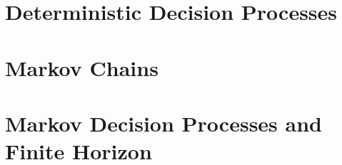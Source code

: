 \documentclass[12pt]{book}
\begin{document}
% 



% 


% 


% 

\setcounter{chapter}{1}
\chapter{Deterministic Decision Processes}
\label{chapter:DDP}


\setcounter{chapter}{2}

\chapter{Markov Chains}
\label{chapter:MC}


\chapter{Markov Decision Processes and Finite Horizon}
\label{chapter:MDP-FH}



%

%
%
\end{document}
